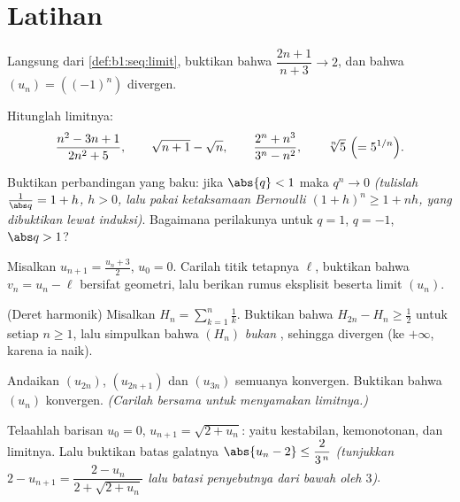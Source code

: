 \section{Latihan}

\begin{exercise}[$\star$]\label{exo:b1:seq:1}
Langsung dari \cref{def:b1:seq:limit}, buktikan bahwa
$\dfrac{2n+1}{n+3} \to 2$, dan bahwa $(u_n) = ((-1)^n)$ divergen.
\end{exercise}

\begin{exercise}[$\star$]\label{exo:b1:seq:2}
Hitunglah limitnya:
\[
\frac{n^2 - 3n + 1}{2n^2 + 5},
\qquad
\sqrt{n+1} - \sqrt n,
\qquad
\frac{2^n + n^3}{3^n - n^2},
\qquad
\sqrt[n]{5}\ \Bigl(= 5^{1/n}\Bigr).
\]
\end{exercise}

\begin{exercise}[$\star$]\label{exo:b1:seq:3}
Buktikan perbandingan yang baku: jika $\abs{q} < 1$ maka $q^n \to 0$
\emph{(tulislah $\frac{1}{\abs q} = 1 + h$, $h > 0$, lalu pakai
ketaksamaan Bernoulli $(1+h)^n \geq 1 + nh$, yang dibuktikan lewat
induksi)}. Bagaimana perilakunya untuk $q = 1$, $q = -1$, $\abs q >
1$?
\end{exercise}

\begin{exercise}[$\star$]\label{exo:b1:seq:4}
Misalkan $u_{n+1} = \frac{u_n + 3}{2}$, $u_0 = 0$. Carilah titik tetapnya
$\ell$, buktikan bahwa $v_n = u_n - \ell$ bersifat geometri, lalu berikan rumus
eksplisit beserta limit $(u_n)$.
\end{exercise}

\begin{exercise}[$\star\star$]\label{exo:b1:seq:5}
(Deret harmonik) Misalkan $H_n = \sum_{k=1}^{n} \frac 1k$. Buktikan bahwa
$H_{2n} - H_n \geq \frac12$ untuk setiap $n \geq 1$, lalu simpulkan bahwa
$(H_n)$ \emph{bukan} , sehingga divergen (ke
$+\infty$, karena ia naik).
\end{exercise}

\begin{exercise}[$\star\star$]\label{exo:b1:seq:6}
Andaikan $(u_{2n})$, $(u_{2n+1})$ dan $(u_{3n})$ semuanya konvergen. Buktikan
bahwa $(u_n)$ konvergen. \emph{(Carilah  bersama untuk menyamakan
limitnya.)}
\end{exercise}

\begin{exercise}[$\star\star$]\label{exo:b1:seq:7}
Telaahlah barisan $u_0 = 0$, $u_{n+1} = \sqrt{2 + u_n}$: yaitu
kestabilan, kemonotonan, dan limitnya. Lalu buktikan batas galatnya
$\abs{u_n - 2} \leq \dfrac{2}{3^{\,n}}$ \emph{(tunjukkan $2 - u_{n+1} =
\dfrac{2 - u_n}{2 + \sqrt{2 + u_n}}$ lalu batasi penyebutnya dari bawah
oleh $3$)}.
\end{exercise}

